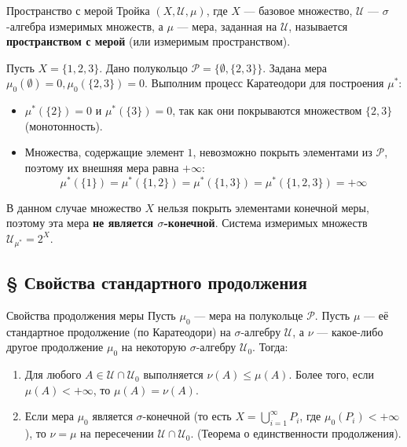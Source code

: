 \documentclass[12pt,a4paper]{article}
\begin{document}
\begin{Definition}{Пространство с мерой}{}
Тройка $(X, \mathcal{U}, \mu)$, где $X$ — базовое множество, $\mathcal{U}$ — $\sigma$-алгебра измеримых множеств, а $\mu$ — мера, заданная на $\mathcal{U}$, называется \textbf{пространством с мерой} (или измеримым пространством).
\end{Definition}

\begin{Example}
Пусть $X = \{1, 2, 3\}$. Дано полукольцо $\mathcal{P} = \{\emptyset, \{2, 3\}\}$. Задана мера $\mu_0(\emptyset) = 0, \mu_0(\{2, 3\}) = 0$.
Выполним процесс Каратеодори для построения $\mu^*$:
\begin{itemize}
    \item $\mu^*(\{2\}) = 0$ и $\mu^*(\{3\}) = 0$, так как они покрываются множеством $\{2, 3\}$ (монотонность).
    \item Множества, содержащие элемент $1$, невозможно покрыть элементами из $\mathcal{P}$, поэтому их внешняя мера равна $+\infty$:
    $$ \mu^*(\{1\}) = \mu^*(\{1, 2\}) = \mu^*(\{1, 3\}) = \mu^*(\{1, 2, 3\}) = +\infty $$
\end{itemize}
В данном случае множество $X$ нельзя покрыть элементами конечной меры, поэтому эта мера \textbf{не является $\sigma$-конечной}. Система измеримых множеств $\mathcal{U}_{\mu^*} = 2^X$.
\end{Example}

\subsection{§ Свойства стандартного продолжения}

\begin{Theorem}{Свойства продолжения меры}{}
Пусть $\mu_0$ — мера на полукольце $\mathcal{P}$. Пусть $\mu$ — её стандартное продолжение (по Каратеодори) на $\sigma$-алгебру $\mathcal{U}$, а $\nu$ — какое-либо другое продолжение $\mu_0$ на некоторую $\sigma$-алгебру $\mathcal{U}_0$. Тогда:
\begin{enumerate}
    \item Для любого $A \in \mathcal{U} \cap \mathcal{U}_0$ выполняется $\nu(A) \le \mu(A)$. Более того, если $\mu(A) < +\infty$, то $\mu(A) = \nu(A)$.
    \item Если мера $\mu_0$ является $\textbf{$\sigma$-конечной}$ (то есть $X = \bigcup\limits_{i=1}^{\infty} P_i$, где $\mu_0(P_i) < +\infty$), то $\nu = \mu$ на пересечении $\mathcal{U} \cap \mathcal{U}_0$. (Теорема о единственности продолжения).
\end{enumerate}
\end{Theorem}
\end{document}
